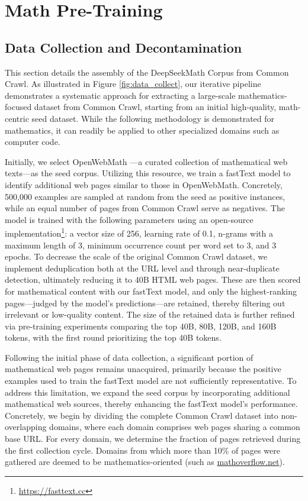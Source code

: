 \section{Math Pre-Training}

\subsection{Data Collection and Decontamination} This section details the assembly of the DeepSeekMath Corpus from Common Crawl. As illustrated in Figure \ref{fig:data_collect}, our iterative pipeline demonstrates a systematic approach for extracting a large-scale mathematics-focused dataset from Common Crawl, starting from an initial high-quality, math-centric seed dataset. While the following methodology is demonstrated for mathematics, it can readily be applied to other specialized domains such as computer code.

Initially, we select OpenWebMath \citep{openwebmath}—a curated collection of mathematical web texts—as the seed corpus. Utilizing this resource, we train a fastText model \citep{joulin2016fasttext} to identify additional web pages similar to those in OpenWebMath. Concretely, 500,000 examples are sampled at random from the seed as positive instances, while an equal number of pages from Common Crawl serve as negatives. The model is trained with the following parameters using an open-source implementation\footnote{\url{https://fasttext.cc}}: a vector size of 256, learning rate of 0.1, n-grams with a maximum length of 3, minimum occurrence count per word set to 3, and 3 epochs. To decrease the scale of the original Common Crawl dataset, we implement deduplication both at the URL level and through near-duplicate detection, ultimately reducing it to 40B HTML web pages. These are then scored for mathematical content with our fastText model, and only the highest-ranking pages—judged by the model’s predictions—are retained, thereby filtering out irrelevant or low-quality content. The size of the retained data is further refined via pre-training experiments comparing the top 40B, 80B, 120B, and 160B tokens, with the first round prioritizing the top 40B tokens.

Following the initial phase of data collection, a significant portion of mathematical web pages remains unacquired, primarily because the positive examples used to train the fastText model are not sufficiently representative. To address this limitation, we expand the seed corpus by incorporating additional mathematical web sources, thereby enhancing the fastText model's performance. Concretely, we begin by dividing the complete Common Crawl dataset into non-overlapping domains, where each domain comprises web pages sharing a common base URL. For every domain, we determine the fraction of pages retrieved during the first collection cycle. Domains from which more than 10\% of pages were gathered are deemed to be mathematics-oriented (such as \url{mathoverflow.net}).

